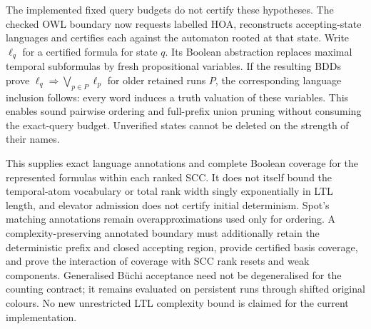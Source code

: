 The implemented fixed query budgets do not certify these hypotheses.
The checked OWL boundary now requests labelled HOA, reconstructs accepting-state
languages and certifies each against the automaton rooted at that state.
Write $\ell_q$ for a certified formula for state $q$. Its Boolean abstraction
replaces maximal temporal subformulas by fresh propositional variables.
If the resulting BDDs prove
$\ell_q\Rightarrow\bigvee_{p\in P}\ell_p$ for older retained runs $P$,
the corresponding language inclusion follows: every word induces a truth
valuation of these variables. This enables sound pairwise ordering and
full-prefix union pruning without consuming the exact-query budget.
Unverified states cannot be deleted on the strength of their names.

This supplies exact language annotations and complete Boolean coverage for
the represented formulas within each ranked SCC. It does not itself bound
the temporal-atom vocabulary or total rank width singly exponentially in LTL
length, and elevator admission does not certify initial determinism.
Spot's matching annotations remain overapproximations used only for ordering.
A complexity-preserving annotated boundary must additionally
retain the deterministic prefix and closed accepting region, provide
certified basis coverage, and prove the interaction of coverage with SCC
rank resets and weak components. Generalised B\"uchi acceptance need not be
degeneralised for the counting contract; it remains evaluated on persistent
runs through shifted original colours. No new unrestricted LTL complexity
bound is claimed for the current implementation.
